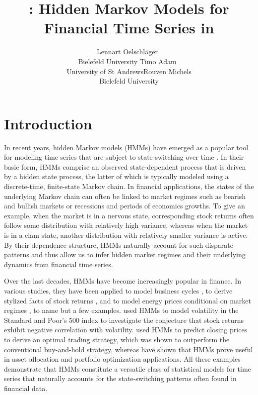 \documentclass[article,shortnames]{jss}
\author{Lennart Oelschl\"ager~\orcidlink{0000-0001-5421-9313}\\Bielefeld University \And Timo Adam~\orcidlink{0000-0001-9079-3259}\\University of St Andrews\And Rouven Michels \\Bielefeld University}
\title{\pkg{fHMM}: Hidden Markov Models for Financial Time Series in \proglang{R}}
\newcommand{\fct}[1]{\code{#1()}}
\begin{document}


\section{Introduction}
\label{sec:intro} %

In recent years, hidden Markov models (HMMs) have emerged as a popular tool for modeling time series that are subject to state-switching over time \citep{zuc16}. In their basic form, HMMs comprise an observed state-dependent process that is driven by a hidden state process, the latter of which is typically modeled using a discrete-time, finite-state Markov chain. In financial applications, the states of the underlying Markov chain can often be linked to market regimes such as bearish and bullish markets or recessions and periods of economics growths. To give an example, when the market is in a nervous state, corresponding stock returns often follow some distribution with relatively high variance, whereas when the market is in a clam state, another distribution with relatively smaller variance is active. By their dependence structure, HMMs naturally account for such disparate patterns and thus allow us to infer hidden market regimes and their underlying dynamics from financial time series.

Over the last decades, HMMs have become increasingly popular in finance. In various studies, they have been applied to model business cycles \citep{kim98, gre00}, to derive stylized facts of stock returns \citep{bul06, nys15a}, and to model energy prices conditional on market regimes \citep{lan18, ada19c, ada22}, to name but a few examples. \cite{lih17} used HMMs to model volatility in the Standard and Poor's 500 index to investigate the conjecture that stock returns exhibit negative correlation with volatility. \cite{ngu18} used HMMs to predict closing prices to derive an optimal trading strategy, which was shown to outperform the conventional buy-and-hold strategy, whereas \cite{bul11, nys15a, nys18} have shown that HMMs prove useful in asset allocation and portfolio optimization applications. All these examples demonstrate that HMMs constitute a versatile class of statistical models for time series that naturally accounts for the state-switching patterns often found in financial data.
\end{document}
